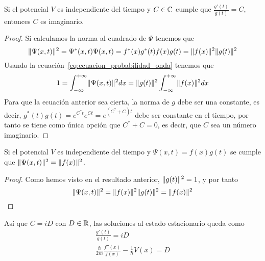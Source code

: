 \begin{resultado}
    Si el potencial $V$ es independiente del tiempo y $C\in\mathbb{C}$ cumple que $\frac{g'(t)}{g(t)}=C$, entonces $C$ es imaginario.
\end{resultado}
\begin{proof}
    Si calculamos la norma al cuadrado de $\Psi$ tenemos que
    \begin{equation*}
        \lVert\Psi(x,t)\rVert^2=\Psi^*(x,t)\Psi(x,t)=f^*(x)g^*(t)f(x)g(t)=\lVert f(x)\rVert^2\lVert g(t)\rVert^2
    \end{equation*}
    Usando la ecuación~\eqref{eq:ecuacion_probabilidad_onda} tenemos que
    \begin{equation*}
        1=\int_{-\infty}^{+\infty}\lVert\Psi(x,t)\rVert^2 dx=\lVert g(t)\rVert^2\int_{-\infty}^{+\infty}\lVert f(x)\rVert^2 dx
    \end{equation*}
    Para que la ecuación anterior sea cierta, la norma de $g$ debe ser una constante, es decir, $g^*(t)g(t)=e^{C^*t}e^{Ct}=e^{(C^*+C)t}$ debe ser constante en el tiempo, por tanto se tiene como única opción que $C^*+C=0$, es decir, que $C$ sea un número imaginario.
\end{proof}

\begin{resultado}
    Si el potencial $V$ es independiente del tiempo y $\Psi(x,t)=f(x)g(t)$ se cumple que $\lVert\Psi(x,t)\rVert^2=\lVert f(x)\rVert^2$.
\end{resultado}
\begin{proof}
    Como hemos visto en el resultado anterior, $\lVert g(t)\rVert^2=1$, y por tanto
    \begin{equation}
        \label{eq:probabilidad_atemporal}
        \lVert\Psi(x,t)\rVert^2=\lVert f(x)\rVert^2\lVert g(t)\rVert^2=\lVert f(x)\rVert^2
    \end{equation}
\end{proof}
Así que $C=iD$ con $D\in\mathbb{R}$, las soluciones al estado estacionario queda como
\begin{gather*}
    \frac{g'(t)}{g(t)}=iD
    \\
    \frac{\hbar}{2m}\frac{f''(x)}{f(x)}-\frac{1}{\hbar}V(x)=D
\end{gather*}

